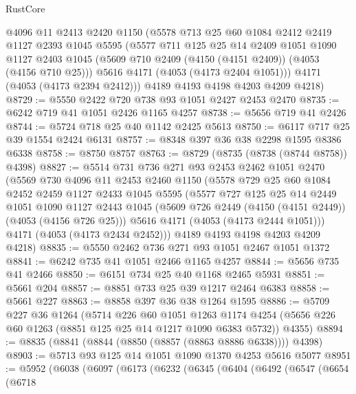 \begin{lexlean}{RustCore}
\begin{coremodule}
      @4096
      @11
      @2413
      @2420
      @1150
      (@5578
        @713
        @25
        @60
        @1084
        @2412
        @2419
        @1127
        @2393
        @1045
        @5595
        (@5577
          @711
          @125
          @25
          @14
          @2409
          @1051
          @1090
          @1127
          @2403
          @1045
          (@5609 @710 @2409 (@4150 (@4151 @2409)) (@4053 (@4156 @710 @25)))
          @5616
          @4171
          (@4053 (@4173 @2404 @1051)))
        @4171
        (@4053 (@4173 @2394 @2412)))
      @4189
      @4193
      @4198
      @4203
      @4209
      @4218)
@8729 := @5550 @2422 @720 @738 @93 @1051 @2427 @2453 @2470
@8735 := @6242 @719 @41 @1051 @2426 @1165 @4257
@8738 := @5656 @719 @41 @2426
@8744 := @5724 @718 @25 @40 @1142 @2425 @5613
@8750 := @6117 @717 @25 @39 @1554 @2424 @6131
@8757 := @8348 @397 @36 @38 @2298 @1595 @8386 @6338
@8758 := @8750 @8757
@8763 := @8729 (@8735 (@8738 (@8744 @8758)) @4398)
@8827 := @5514
    @731
    @736
    @271
    @93
    @2453
    @2462
    @1051
    @2470
    (@5569
      @730
      @4096
      @11
      @2453
      @2460
      @1150
      (@5578
        @729
        @25
        @60
        @1084
        @2452
        @2459
        @1127
        @2433
        @1045
        @5595
        (@5577
          @727
          @125
          @25
          @14
          @2449
          @1051
          @1090
          @1127
          @2443
          @1045
          (@5609 @726 @2449 (@4150 (@4151 @2449)) (@4053 (@4156 @726 @25)))
          @5616
          @4171
          (@4053 (@4173 @2444 @1051)))
        @4171
        (@4053 (@4173 @2434 @2452)))
      @4189
      @4193
      @4198
      @4203
      @4209
      @4218)
@8835 := @5550 @2462 @736 @271 @93 @1051 @2467 @1051 @1372
@8841 := @6242 @735 @41 @1051 @2466 @1165 @4257
@8844 := @5656 @735 @41 @2466
@8850 := @6151 @734 @25 @40 @1168 @2465 @5931
@8851 := @5661 @204
@8857 := @8851 @733 @25 @39 @1217 @2464 @6383
@8858 := @5661 @227
@8863 := @8858 @397 @36 @38 @1264 @1595
@8886 := @5709
    @227
    @36
    @1264
    (@5714
      @226
      @60
      @1051
      @1263
      @1174
      @4254
      (@5656 @226 @60 @1263 (@8851 @125 @25 @14 @1217 @1090 @6383 @5732))
      @4355)
@8894 := @8835 (@8841 (@8844 (@8850 (@8857 (@8863 @8886 @6338)))) @4398)
@8903 := @5713 @93 @125 @14 @1051 @1090 @1370 @4253 @5616 @5077
@8951 := @5952
    (@6038
      (@6097
        (@6173
          (@6232
            (@6345
              (@6404
                (@6492
                  (@6547
                    (@6654
                      (@6718

\end{coremodule}
\end{lexlean}
